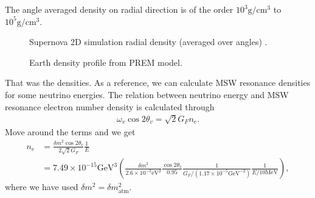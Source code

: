 \documentclass[letterpaper,12pt,english]{sphinxmanual}
\begin{document}
The angle averaged density on radial direction is of the order \(10^3\mathrm{g/cm^3}\) to \(10^5\mathrm{g/cm^3}\).
\begin{figure}[htbp]
\centering
\capstart

\noindent{}
\caption{Supernova 2D simulation radial density (averaged over angles) \label{\detokenize{matter-stimulated/scales:id4}}{\hyperref[\detokenize{matter-stimulated/scales:eborriello2014}]{\sphinxcrossref{{[}EBorriello2014{]}}}}.}\label{\detokenize{matter-stimulated/scales:id7}}\end{figure}
\begin{figure}[htbp]
\centering
\capstart

\noindent{}
\caption{Earth density profile from PREM model.}\label{\detokenize{matter-stimulated/scales:id8}}\end{figure}

That was the densities. As a reference, we can calculate MSW resonance densities for some neutrino energies. The relation between neutrino energy and MSW resonance electron number density is calculated through
\begin{equation*}
\begin{split}\omega_v \cos 2\theta_v = \sqrt{2} G_F n_e .\end{split}
\end{equation*}
Move around the terms and we get
\begin{equation*}
\begin{split}n_e &= \frac{\delta m^2 \cos 2\theta_v}{2\sqrt{2} G_F} \frac{1}{E} \\
&= 7.49\times 10^{-15}\mathrm{GeV^3} \left(  \frac{\delta m^2}{2.6\times 10^{-3}\mathrm{eV^2}} \frac{\cos 2\theta_v}{0.95} \frac{1}{G_F/(1.17\times 10^{-5}\mathrm{GeV^{-2}})} \frac{1}{E/10\mathrm{MeV}} \right),\end{split}
\end{equation*}
where we have used \(\delta m^2 = \delta m^2_{\mathrm{atm}}\).
\end{document}
